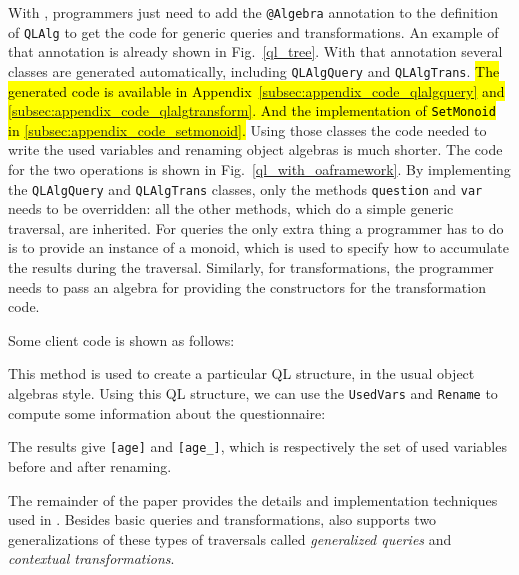 With \Name, programmers just need to add the \lstinline{@Algebra} annotation
to the definition of \lstinline{QLAlg} to get the code for generic
queries and transformations. An example of that annotation is already
shown in Fig.~\ref{ql_tree}. With that annotation several classes
are generated automatically, including \lstinline{QLAlgQuery} and
\lstinline{QLAlgTrans}. \hl{The generated code is available in Appendix~\ref{subsec:appendix_code_qlalgquery} and \ref{subsec:appendix_code_qlalgtransform}. And the implementation of \lstinline{SetMonoid} in \ref{subsec:appendix_code_setmonoid}.} Using those classes the code needed to write
the used variables and renaming object algebras is much
shorter. The code for the two operations is shown in
Fig.~\ref{ql_with_oaframework}. By implementing the
\lstinline{QLAlgQuery} and \lstinline{QLAlgTrans} classes, only the methods
\lstinline{question} and \lstinline{var} needs to be overridden: all the other methods,
which do a simple generic traversal, are inherited. For queries the
only extra thing a programmer has to do is to provide an instance of a
monoid, which is used to specify how to accumulate the results during
the traversal. Similarly, for transformations, the programmer needs to
pass an algebra for providing the constructors for the transformation
code.

Some client code is shown as follows: %


This method is used to create a particular QL structure, in the
usual object algebras style.
Using this QL structure, we can use the \lstinline{UsedVars}
and \lstinline{Rename} to compute some information about the questionnaire:


The results give \lstinline{[age]} and \lstinline{[age_]}, which
is respectively the set of used variables before and after renaming.

The remainder of the paper provides the details and implementation
techniques used in \Name. Besides basic queries and transformations,
\name also supports two generalizations of these types of traversals
called \emph{generalized queries} and \emph{contextual transformations}.

